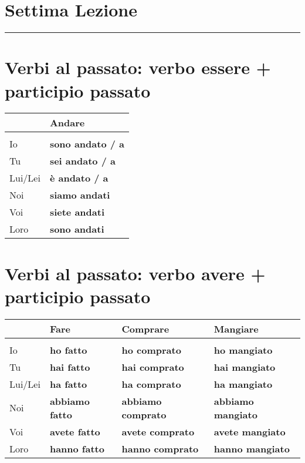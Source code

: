 \documentclass[letter,11pt]{article}
\begin{document}
\section*{\Large{Settima Lezione}}
\noindent\rule{16cm}{1pt}

\setlength{\parindent}{260pt}

\vskip 0.2in
\section*{Verbi al passato: verbo essere + participio passato}
\vskip 0.2in

\begin{tabular}{ |p{2cm}| p{3cm}| }
      & Andare   \\
    \hline
    \hline
     &    \\ \hline
    Io      & {\bf sono andato / a}     \\ \hline
    Tu      & {\bf sei andato / a}      \\ \hline
    Lui/Lei & {\bf è andato / a}        \\ \hline
    Noi     & {\bf siamo andati}    \\ \hline
    Voi     & {\bf siete andati}    \\ \hline
    Loro    & {\bf sono andati}    \\ \hline
    \hline
\end{tabular}

\vskip 0.2in
\section*{Verbi al passato: verbo avere + participio passato}
\vskip 0.2in

\begin{tabular}{ |p{2cm}| p{4cm}| p{4cm}| p{4cm}| }
      & Fare  & Comprare & Mangiare  \\
    \hline
    \hline
     &  &  & \\ \hline
    Io      & {\bf ho fatto}      & {\bf ho comprato}     &  {\bf ho mangiato} \\ \hline
    Tu      & {\bf hai fatto}     & {\bf hai comprato}  &  {\bf hai mangiato}  \\ \hline
    Lui/Lei & {\bf ha fatto}      & {\bf ha comprato}   &  {\bf ha mangiato}\\ \hline
    Noi     & {\bf abbiamo fatto} & {\bf abbiamo comprato} & {\bf abbiamo mangiato} \\ \hline
    Voi     & {\bf avete fatto}   & {\bf avete comprato}   &  {\bf avete mangiato}  \\ \hline
    Loro    & {\bf hanno fatto}   & {\bf hanno comprato}   &  {\bf hanno mangiato}  \\ \hline
    \hline
\end{tabular}
\end{document}
